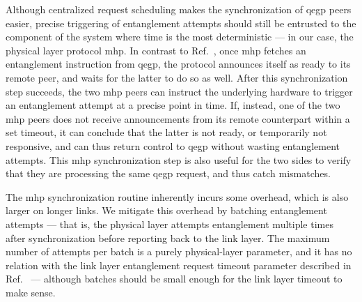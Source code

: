 Although centralized request scheduling makes the synchronization of \acrshort{qegp} peers easier,
precise triggering of entanglement attempts should still be entrusted to the component of the system
where time is the most deterministic --- in our case, the physical layer protocol \acrshort{mhp}. In
contrast to Ref.~\cite{dahlberg_2019_egp}, once \acrshort{mhp} fetches an entanglement instruction
from \acrshort{qegp}, the protocol announces itself as ready to its remote peer, and waits for the
latter to do so as well. After this synchronization step succeeds, the two \acrshort{mhp} peers can
instruct the underlying hardware to trigger an entanglement attempt at a precise point in time. If,
instead, one of the two \acrshort{mhp} peers does not receive announcements from its remote
counterpart within a set timeout, it can conclude that the latter is not ready, or temporarily not
responsive, and can thus return control to \acrshort{qegp} without wasting entanglement attempts.
This \acrshort{mhp} synchronization step is also useful for the two sides to verify that they are
processing the same \acrshort{qegp} request, and thus catch mismatches.

The \acrshort{mhp} synchronization routine inherently incurs some overhead, which is also larger on
longer links. We mitigate this overhead by batching entanglement attempts --- that is, the physical
layer attempts entanglement multiple times after synchronization before reporting back to the link
layer. The maximum number of attempts per batch is a purely physical-layer parameter, and it has no
relation with the link layer entanglement request timeout parameter described in
Ref.~\cite{dahlberg_2019_egp} --- although batches should be small enough for the link layer timeout
to make sense.

